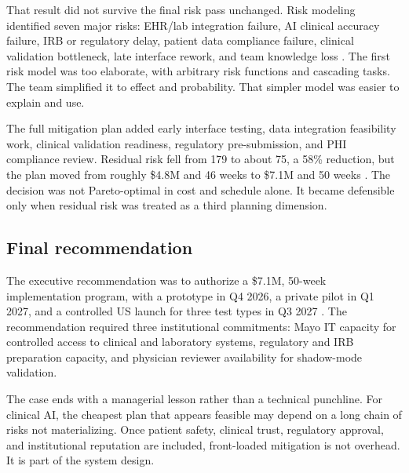 That result did not survive the final risk pass unchanged. Risk modeling identified seven major risks: EHR/lab integration failure, AI clinical accuracy failure, IRB or regulatory delay, patient data compliance failure, clinical validation bottleneck, late interface rework, and team knowledge loss \cite{sanguine_os17}. The first risk model was too elaborate, with arbitrary risk functions and cascading tasks. The team simplified it to effect and probability. That simpler model was easier to explain and use.

The full mitigation plan added early interface testing, data integration feasibility work, clinical validation readiness, regulatory pre-submission, and PHI compliance review. Residual risk fell from 179 to about 75, a 58\% reduction, but the plan moved from roughly \$4.8M and 46 weeks to \$7.1M and 50 weeks \cite{sanguine_os17}. The decision was not Pareto-optimal in cost and schedule alone. It became defensible only when residual risk was treated as a third planning dimension.

\subsection{Final recommendation}

The executive recommendation was to authorize a \$7.1M, 50-week implementation program, with a prototype in Q4 2026, a private pilot in Q1 2027, and a controlled US launch for three test types in Q3 2027 \cite{sanguine_memo}. The recommendation required three institutional commitments: Mayo IT capacity for controlled access to clinical and laboratory systems, regulatory and IRB preparation capacity, and physician reviewer availability for shadow-mode validation.

The case ends with a managerial lesson rather than a technical punchline. For clinical AI, the cheapest plan that appears feasible may depend on a long chain of risks not materializing. Once patient safety, clinical trust, regulatory approval, and institutional reputation are included, front-loaded mitigation is not overhead. It is part of the system design.
